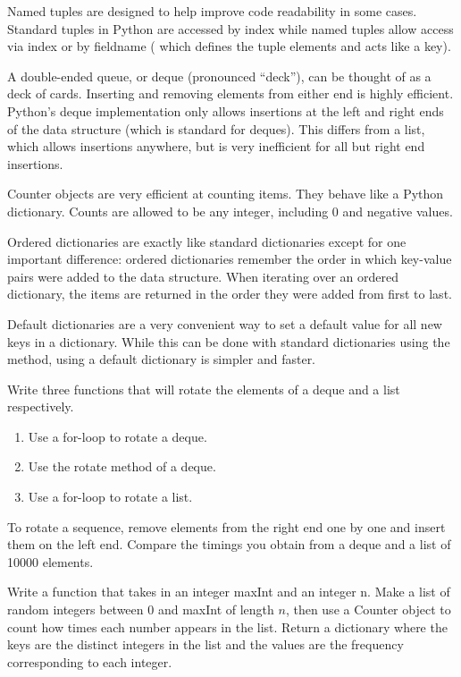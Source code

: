 Named tuples are designed to help improve code readability in some cases.
Standard tuples in Python are accessed by index while named tuples allow access via index or by  fieldname ( which defines the tuple elements and acts like a key).

A double-ended queue, or deque (pronounced ``deck''), can be thought of as a deck of cards.
Inserting and removing elements from either end is highly efficient.
Python's deque implementation only allows insertions at the left and right ends of the data structure (which is standard for deques).
This differs from a list, which allows insertions anywhere, but is very inefficient for all but right end insertions.

Counter objects are very efficient at counting items.  They behave like a Python dictionary.  Counts are allowed to be any integer, including 0 and negative values.

Ordered dictionaries are exactly like standard dictionaries except for one important difference:
ordered dictionaries remember the order in which key-value pairs were added to the data structure.
When iterating over an ordered dictionary, the items are returned in the order they were added from first to last.

Default dictionaries are a very convenient way to set a default value for all new keys in a dictionary.
While this can be done with standard dictionaries using the  method, using a default dictionary is simpler and faster.

\begin{problem}
Write three functions that will rotate the elements of a deque and a list respectively.
\begin{enumerate}
\item Use a for-loop to rotate a deque.
\item Use the rotate method of a deque.
\item Use a for-loop to rotate a list.
\end{enumerate}

To rotate a sequence, remove elements from the right end one by one and insert them on the left end.
Compare the timings you obtain from a deque and a list of 10000 elements.
\end{problem}

\begin{problem}
Write a function that takes in an integer maxInt and an integer n.
Make a list of random integers between 0 and maxInt of length $n$, then use a Counter object to count how times each number appears in the list.
Return a dictionary where the keys are the distinct integers in the list and the values are the frequency corresponding to each integer.
\end{problem}

